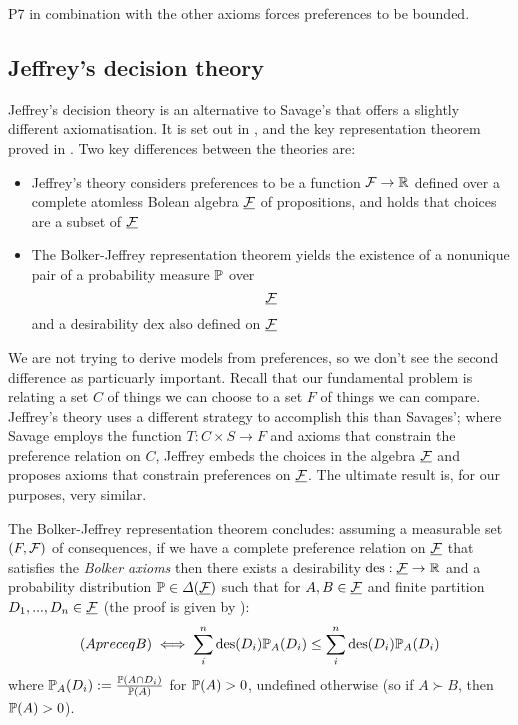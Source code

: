 P7 in combination with the other axioms forces preferences to be bounded.

\subsection{Jeffrey's decision theory}

Jeffrey's decision theory is an alternative to Savage's that offers a slightly different axiomatisation. It is set out in \citet{jeffrey_logic_1990}, and the key representation theorem proved in \citet{bolker_functions_1966}. Two key differences between the theories are:
\begin{itemize}
    \item Jeffrey's theory considers preferences to be a function $\mathcal{F}\to \mathbb{R}$ defined over a complete atomless Bolean algebra $\underline{\mathcal{F}}$ of propositions, and holds that choices are a subset of $\underline{\mathcal{F}}$
    \item The Bolker-Jeffrey representation theorem yields the existence of a nonunique pair of a probability measure $\mathbb{P}$ over $$\underline{\mathcal{F}}$$ and a desirability $\mathrm{dex}$ also defined on $\underline{\mathcal{F}}$
\end{itemize}

We are not trying to derive models from preferences, so we don't see the second difference as particuarly important. Recall that our fundamental problem is relating a set $C$ of things we can choose to a set $F$ of things we can compare. Jeffrey's theory uses a different strategy to accomplish this than Savages'; where Savage employs the function $T:C\times S\to F$ and axioms that constrain the preference relation on $C$, Jeffrey embeds the choices in the algebra $\underline{\mathcal{F}}$ and proposes axioms that constrain preferences on $\underline{\mathcal{F}}$. The ultimate result is, for our purposes, very similar.

The Bolker-Jeffrey representation theorem concludes: assuming a measurable set $(F,\mathcal{F})$ of consequences, if we have a complete preference relation on $\underline{\mathcal{F}}$ that satisfies the \emph{Bolker axioms} then there exists a desirability $\text{des}:\underline{\mathcal{F}}\to\mathbb{R}$ and a probability distribution $\mathbb{P}\in \Delta(\underline{\mathcal{F}})$ such that for $A,B\in \underline{\mathcal{F}}$ and finite partition $D_1,...,D_n\in \underline{\mathcal{F}}$ (the proof is given by \citet{bolker_functions_1966}):
\begin{align}
    (A preceq B) \iff \sum_{i}^n \text{des}(D_i) \mathbb{P}_A(D_i) \leq \sum_{i}^n \text{des}(D_i) \mathbb{P}_A(D_i) \label{eq:ev_dec_theory}
\end{align}
where $\mathbb{P}_A(D_i):=\frac{\mathbb{P}(A\cap D_i)}{\mathbb{P}(A)}$ for $\mathbb{P}(A)>0$, undefined otherwise (so if $A\succ B$, then $\mathbb{P}(A)>0$).

